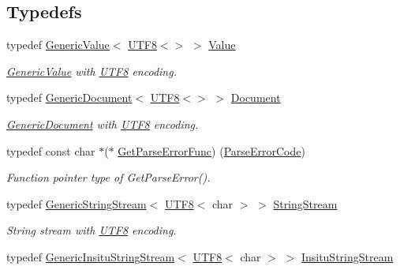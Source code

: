 \subsection*{Typedefs}
\begin{DoxyCompactItemize}
\item 
typedef \mbox{\hyperlink{classrapidjson_1_1_generic_value}{Generic\+Value}}$<$ \mbox{\hyperlink{structrapidjson_1_1_u_t_f8}{U\+T\+F8}}$<$$>$ $>$ \mbox{\hyperlink{namespacerapidjson_aa65fc9fb381b2cbc54f98673eadd6505}{Value}}
\begin{DoxyCompactList}\small\item\em \mbox{\hyperlink{classrapidjson_1_1_generic_value}{Generic\+Value}} with \mbox{\hyperlink{structrapidjson_1_1_u_t_f8}{U\+T\+F8}} encoding. \end{DoxyCompactList}\item 
typedef \mbox{\hyperlink{classrapidjson_1_1_generic_document}{Generic\+Document}}$<$ \mbox{\hyperlink{structrapidjson_1_1_u_t_f8}{U\+T\+F8}}$<$$>$ $>$ \mbox{\hyperlink{namespacerapidjson_ace11b5b575baf1cccd5ba5f8586dcdc8}{Document}}
\begin{DoxyCompactList}\small\item\em \mbox{\hyperlink{classrapidjson_1_1_generic_document}{Generic\+Document}} with \mbox{\hyperlink{structrapidjson_1_1_u_t_f8}{U\+T\+F8}} encoding. \end{DoxyCompactList}\item 
typedef const char $\ast$($\ast$ \mbox{\hyperlink{group___r_a_p_i_d_j_s_o_n___e_r_r_o_r_s_gafde34fb0f573d1b551b566cc03e294fb}{Get\+Parse\+Error\+Func}}) (\mbox{\hyperlink{group___r_a_p_i_d_j_s_o_n___e_r_r_o_r_s_ga7d3acf640886b1f2552dc8c4cd6dea60}{Parse\+Error\+Code}})
\begin{DoxyCompactList}\small\item\em Function pointer type of Get\+Parse\+Error(). \end{DoxyCompactList}\item 
typedef \mbox{\hyperlink{structrapidjson_1_1_generic_string_stream}{Generic\+String\+Stream}}$<$ \mbox{\hyperlink{structrapidjson_1_1_u_t_f8}{U\+T\+F8}}$<$ char $>$ $>$ \mbox{\hyperlink{namespacerapidjson_a021f77051e9f85188fc2f71ff5a15ebc}{String\+Stream}}
\begin{DoxyCompactList}\small\item\em String stream with \mbox{\hyperlink{structrapidjson_1_1_u_t_f8}{U\+T\+F8}} encoding. \end{DoxyCompactList}\item 
typedef \mbox{\hyperlink{structrapidjson_1_1_generic_insitu_string_stream}{Generic\+Insitu\+String\+Stream}}$<$ \mbox{\hyperlink{structrapidjson_1_1_u_t_f8}{U\+T\+F8}}$<$ char $>$ $>$ \mbox{\hyperlink{namespacerapidjson_a64e957c8d9d7cd15b193ffc31410038e}{Insitu\+String\+Stream}}

\end{DoxyCompactItemize}
